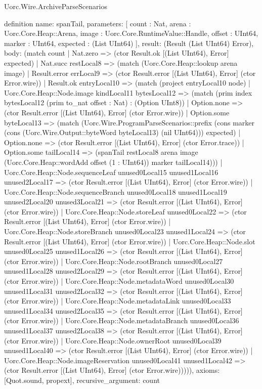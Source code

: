 \begin{lexlean}{Uorc.Wire.ArchiveParseScenarios}
\begin{semanticmodule}
definition{
  name: spanTail,
  parameters: [
    count : Nat,
    arena : Uorc.Core.Heap::Arena,
    image : Uorc.Core.RuntimeValue::Handle,
    offset : UInt64,
    marker : UInt64,
    expected : (List UInt64)
  ],
  result: (Result (List UInt64) Error),
  body: (match count
    | Nat.zero => (ctor Result.ok [(List UInt64), Error] expected)
    | Nat.succ restLocal8 => (match (Uorc.Core.Heap::lookup arena image)
      | Result.error errLocal9 => (ctor Result.error [(List UInt64), Error] (ctor Error.wire))
      | Result.ok entryLocal10 => (match (project entryLocal10 node)
        | Uorc.Core.Heap::Node.image kindLocal11 bytesLocal12 => (match (prim index bytesLocal12 (prim to_nat offset : Nat) : (Option UInt8))
          | Option.none => (ctor Result.error [(List UInt64), Error] (ctor Error.wire))
          | Option.some byteLocal13 => (match (Uorc.Wire.ProgramParseScenarios::prefix (cons marker (cons (Uorc.Wire.Output::byteWord byteLocal13) (nil UInt64))) expected)
            | Option.none => (ctor Result.error [(List UInt64), Error] (ctor Error.trace))
            | Option.some tailLocal14 => (spanTail restLocal8 arena image (Uorc.Core.Heap::wordAdd offset (1 : UInt64)) marker tailLocal14)))
        | Uorc.Core.Heap::Node.sequenceLeaf unused0Local15 unused1Local16 unused2Local17 => (ctor Result.error [(List UInt64), Error] (ctor Error.wire))
        | Uorc.Core.Heap::Node.sequenceBranch unused0Local18 unused1Local19 unused2Local20 unused3Local21 => (ctor Result.error [(List UInt64), Error] (ctor Error.wire))
        | Uorc.Core.Heap::Node.storeLeaf unused0Local22 => (ctor Result.error [(List UInt64), Error] (ctor Error.wire))
        | Uorc.Core.Heap::Node.storeBranch unused0Local23 unused1Local24 => (ctor Result.error [(List UInt64), Error] (ctor Error.wire))
        | Uorc.Core.Heap::Node.slot unused0Local25 unused1Local26 => (ctor Result.error [(List UInt64), Error] (ctor Error.wire))
        | Uorc.Core.Heap::Node.rootBranch unused0Local27 unused1Local28 unused2Local29 => (ctor Result.error [(List UInt64), Error] (ctor Error.wire))
        | Uorc.Core.Heap::Node.metadataWord unused0Local30 unused1Local31 unused2Local32 => (ctor Result.error [(List UInt64), Error] (ctor Error.wire))
        | Uorc.Core.Heap::Node.metadataLink unused0Local33 unused1Local34 unused2Local35 => (ctor Result.error [(List UInt64), Error] (ctor Error.wire))
        | Uorc.Core.Heap::Node.metadataBranch unused0Local36 unused1Local37 unused2Local38 => (ctor Result.error [(List UInt64), Error] (ctor Error.wire))
        | Uorc.Core.Heap::Node.ownerRoot unused0Local39 unused1Local40 => (ctor Result.error [(List UInt64), Error] (ctor Error.wire))
        | Uorc.Core.Heap::Node.imageReservation unused0Local41 unused1Local42 => (ctor Result.error [(List UInt64), Error] (ctor Error.wire))))),
  axioms: [Quot.sound, propext],
  recursive_argument: count
}


\end{semanticmodule}
\end{lexlean}
